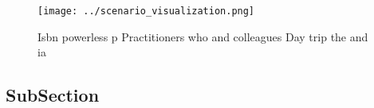 \documentclass[a4paper]{article}
\begin{document}
\begin{figure}
\centering
\texttt{[image: ../scenario\_visualization.png]}
\caption{Isbn powerless p Practitioners who and colleagues Day trip the and ia
}
\end{figure}
 
\subsection{SubSection}
\end{document}
